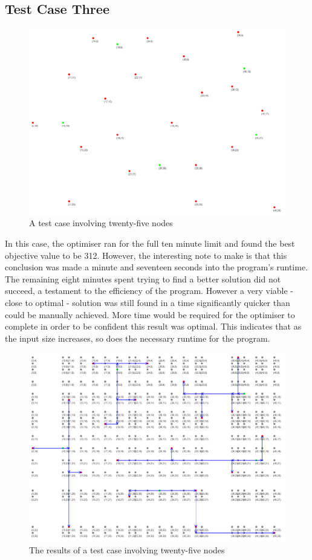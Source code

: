 \subsection{Test Case Three}\label{testcase3}

\begin{figure}[H]
    \centering
    \includegraphics[width=0.9\linewidth]{test4.png}
    \caption{A test case involving twenty-five nodes}
    \label{fig:testcase3}
\end{figure}

In this case, the optimiser ran for the full ten minute limit and found the best objective value to be 312. However, the interesting note to make is that this conclusion was made a minute and seventeen seconds into the program's runtime. The remaining eight minutes spent trying to find a better solution did not succeed, a testament to the efficiency of the program. However a very viable - close to optimal - solution was still found in a time significantly quicker than could be manually achieved. More time would be required for the optimiser to complete in order to be confident this result was optimal. This indicates that as the input size increases, so does the necessary runtime for the program. 

\begin{figure}[H]
    \centering
    \includegraphics[width=0.9\linewidth]{resultstest4.png}
    \caption{The results of a test case involving twenty-five nodes}
    \label{fig:testcase3results}
\end{figure}

